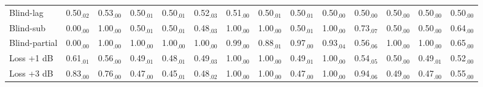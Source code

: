 \begin{tabular}{lccccccccccccc}
Blind-lag & 0.50$_{.02}$ & 0.53$_{.00}$ & 0.50$_{.01}$ & 0.50$_{.01}$ & 0.52$_{.03}$ & 0.51$_{.00}$ & 0.50$_{.01}$ & 0.50$_{.01}$ & 0.50$_{.00}$ & 0.50$_{.00}$ & 0.50$_{.00}$ & 0.50$_{.00}$ & 0.50$_{.00}$\\
Blind-sub & 0.00$_{.00}$ & 1.00$_{.00}$ & 0.50$_{.01}$ & 0.50$_{.01}$ & 0.48$_{.03}$ & 1.00$_{.00}$ & 1.00$_{.00}$ & 0.50$_{.01}$ & 1.00$_{.00}$ & 0.73$_{.07}$ & 0.50$_{.00}$ & 0.50$_{.00}$ & 0.64$_{.00}$\\
Blind-partial & 0.00$_{.00}$ & 1.00$_{.00}$ & 1.00$_{.00}$ & 1.00$_{.00}$ & 1.00$_{.00}$ & 0.99$_{.00}$ & 0.88$_{.01}$ & 0.97$_{.00}$ & 0.93$_{.04}$ & 0.56$_{.06}$ & 1.00$_{.00}$ & 1.00$_{.00}$ & 0.65$_{.00}$\\
Loss +1 dB & 0.61$_{.01}$ & 0.56$_{.00}$ & 0.49$_{.01}$ & 0.48$_{.01}$ & 0.49$_{.03}$ & 1.00$_{.00}$ & 1.00$_{.00}$ & 0.49$_{.01}$ & 1.00$_{.00}$ & 0.54$_{.05}$ & 0.50$_{.00}$ & 0.49$_{.01}$ & 0.52$_{.00}$\\
Loss +3 dB & 0.83$_{.00}$ & 0.76$_{.00}$ & 0.47$_{.00}$ & 0.45$_{.01}$ & 0.48$_{.02}$ & 1.00$_{.00}$ & 1.00$_{.00}$ & 0.47$_{.00}$ & 1.00$_{.00}$ & 0.94$_{.06}$ & 0.49$_{.00}$ & 0.47$_{.00}$ & 0.55$_{.00}$\\
\hline
\end{tabular}